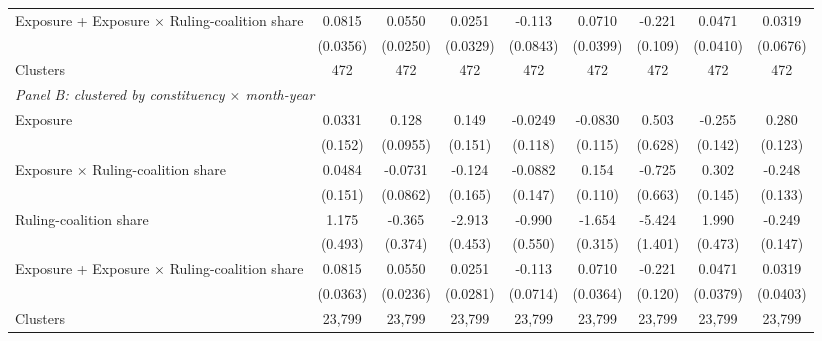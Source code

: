 {\begin{tabular}{l*{8}{c}}
Exposure + Exposure $\times$ Ruling-coalition share&0.0815\sym{**}         &0.0550\sym{**}         &      0.0251         &      -0.113         &0.0710\sym{*}         &-0.221\sym{**}         &      0.0471         &      0.0319         \\
            &    (0.0356)         &    (0.0250)         &    (0.0329)         &    (0.0843)         &    (0.0399)         &     (0.109)         &    (0.0410)         &    (0.0676)         \\
Clusters    &         472         &         472         &         472         &         472         &         472         &         472         &         472         &         472         \\
\midrule

\multicolumn{9}{l}{\textit{Panel B: clustered by constituency $\times$ month-year}} \\
Exposure    &      0.0331         &       0.128         &       0.149         &     -0.0249         &     -0.0830         &       0.503         &      -0.255\sym{*}  &       0.280\sym{**} \\
            &     (0.152)         &    (0.0955)         &     (0.151)         &     (0.118)         &     (0.115)         &     (0.628)         &     (0.142)         &     (0.123)         \\
Exposure $\times$ Ruling-coalition share&      0.0484         &     -0.0731         &      -0.124         &     -0.0882         &       0.154         &      -0.725         &       0.302\sym{**} &      -0.248\sym{*}  \\
            &     (0.151)         &    (0.0862)         &     (0.165)         &     (0.147)         &     (0.110)         &     (0.663)         &     (0.145)         &     (0.133)         \\
Ruling-coalition share&       1.175\sym{**} &      -0.365         &      -2.913\sym{***}&      -0.990\sym{*}  &      -1.654\sym{***}&      -5.424\sym{***}&       1.990\sym{***}&      -0.249\sym{*}  \\
            &     (0.493)         &     (0.374)         &     (0.453)         &     (0.550)         &     (0.315)         &     (1.401)         &     (0.473)         &     (0.147)         \\

Exposure + Exposure $\times$ Ruling-coalition share&0.0815\sym{**}         &0.0550\sym{**}         &      0.0251         &      -0.113         &0.0710\sym{*}         &-0.221\sym{*}         &      0.0471         &      0.0319         \\
            &    (0.0363)         &    (0.0236)         &    (0.0281)         &    (0.0714)         &    (0.0364)         &     (0.120)         &    (0.0379)         &    (0.0403)         \\
Clusters    &      23,799         &      23,799         &      23,799         &      23,799         &      23,799         &      23,799         &      23,799         &      23,799         \\
\midrule


\end{tabular}}
